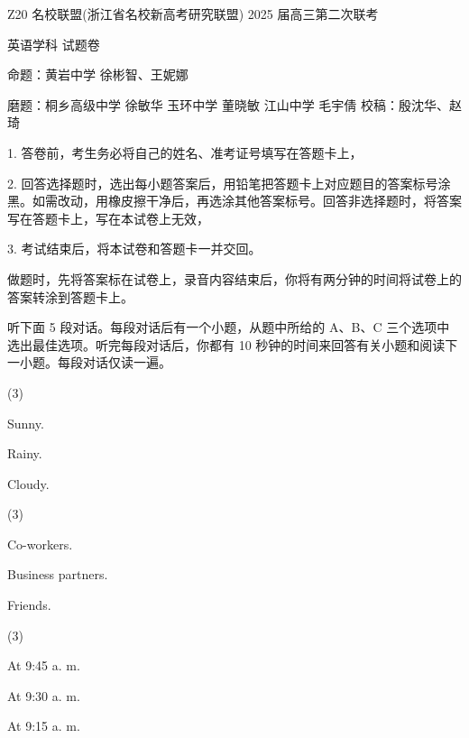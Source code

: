 \documentclass{英语试卷}
\begin{document}
\par Z20 名校联盟(浙江省名校新高考研究联盟) 2025 届高三第二次联考\par
\par 英语学科 试题卷\par
\par 命题：黄岩中学 徐彬智、王妮娜\par
\par 磨题：桐乡高级中学 徐敏华 玉环中学 董晓敏 江山中学 毛宇倩 校稿：殷沈华、赵琦\par
\begin{notice}
\par 1. 答卷前，考生务必将自己的姓名、准考证号填写在答题卡上，\par
\par 2. 回答选择题时，选出每小题答案后，用铅笔把答题卡上对应题目的答案标号涂黑。如需改动，用橡皮擦干净后，再选涂其他答案标号。回答非选择题时，将答案写在答题卡上，写在本试卷上无效，\par
\par 3. 考试结束后，将本试卷和答题卡一并交回。\par
\end{notice}
\par 做题时，先将答案标在试卷上，录音内容结束后，你将有两分钟的时间将试卷上的答案转涂到答题卡上。\par
{}
\par 听下面 5 段对话。每段对话后有一个小题，从题中所给的 A、B、C 三个选项中选出最佳选项。听完每段对话后，你都有 10 秒钟的时间来回答有关小题和阅读下一小题。每段对话仅读一遍。\par
{}
\begin{choices}(3)
  \item Sunny.
  \item Rainy.
  \item Cloudy.
\end{choices}
\begin{choices}(3)
  \item Co-workers.
  \item Business partners.
  \item Friends.
\end{choices}
\begin{choices}(3)
  \item At 9:45 a. m.
  \item At 9:30 a. m.
  \item At 9:15 a. m.
\end{choices}
\end{document}
